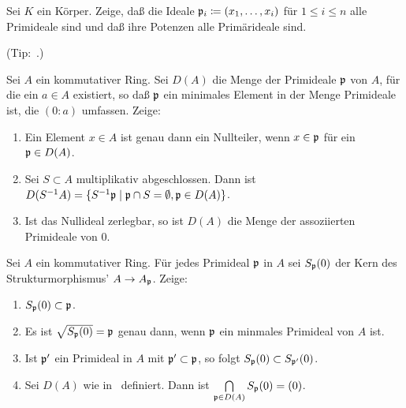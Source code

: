 \begin{exercise}
	Sei \(K\) ein Körper. Zeige, daß die Ideale \(\mathfrak{p}_i \coloneqq
	(x_1, \dotsc, x_i)\) für \(1 \leq i \leq n\) alle Primideale sind und
	daß ihre Potenzen alle Primärideale sind.
	
	(Tip:~.)
\end{exercise}

\begin{exercise}
	\label{exer:assoc_primes_to_zero}
	Sei \(A\) ein kommutativer Ring. Sei \(D(A)\) die Menge der Primideale
	\(\mathfrak{p}\) von \(A\), für die ein \(a \in A\) existiert, so daß
	\(\mathfrak{p}\) ein minimales Element in der Menge Primideale ist, die
	\((0 : a)\) umfassen. Zeige:
	\begin{enumerate}
	\item
		Ein Element \(x \in A\) ist genau dann ein Nullteiler,
		wenn \(x \in \mathfrak{p}\) für ein \(\mathfrak{p} \in D(A)\).
	\item
		Sei \(S \subset A\) multiplikativ abgeschlossen. Dann ist
		\(D(S^{-1} A) = \{S^{-1} \mathfrak{p} \mid \mathfrak{p} \cap S = \emptyset,
			\mathfrak{p} \in D(A)\}\).
	\item
		Ist das Nullideal zerlegbar, so ist \(D(A)\) die Menge der assoziierten
		Primideale von \(0\).
	\end{enumerate}
\end{exercise}

\begin{exercise}
	\label{exer:zero_germ}
	Sei \(A\) ein kommutativer Ring. Für jedes Primideal \(\mathfrak{p}\) in \(A\)
	sei \(S_{\mathfrak{p}}(0)\) der Kern des Strukturmorphismus' \(A \to A_{\mathfrak{p}}\).
	Zeige:
	\begin{enumerate}
	\item
		\(S_{\mathfrak{p}}(0) \subset \mathfrak{p}\).
	\item
		Es ist \(\sqrt{S_{\mathfrak{p}}(0)} = \mathfrak{p}\) genau dann, wenn
		\(\mathfrak{p}\) ein minmales Primideal von \(A\) ist.
	\item
		Ist \(\mathfrak{p}'\) ein Primideal in \(A\) mit \(\mathfrak{p}' \subset
		\mathfrak{p}\), so folgt \(S_{\mathfrak{p}}(0) \subset S_{\mathfrak{p}'}(0)\).
	\item
		Sei \(D(A)\) wie in~ definiert.
		Dann ist \(\bigcap\limits_{\mathfrak{p} \in D(A)} S_{\mathfrak{p}}(0) = (0)\).
	\end{enumerate}
\end{exercise}

